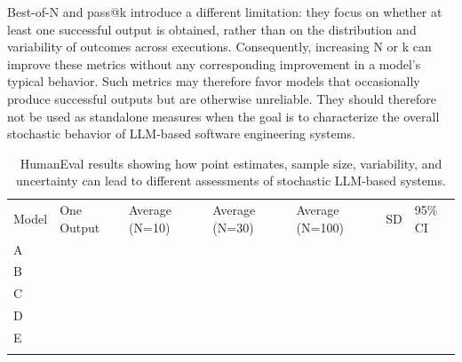 \documentclass{IEEEcsmag}
\begin{document}
Best-of-N and pass@k introduce a different limitation: they focus on whether at least one successful output is obtained, rather than on the distribution and variability of outcomes across executions. Consequently, increasing N or k can improve these metrics without any corresponding improvement in a model's typical behavior.  Such metrics may therefore favor models that occasionally produce successful outputs but are otherwise unreliable. They should therefore not be used as standalone measures when the goal is to characterize the overall stochastic behavior of LLM-based software engineering systems.



\begin{table}
	\vspace*{4pt}
	\caption{HumanEval results showing how point estimates, sample size, variability, and uncertainty can lead to different assessments of stochastic LLM-based systems.}
	\label{table:example-data}
	\begin{tabular*}{\linewidth}{lllllll}
		\toprule
		Model & One Output & Average (N=10) & Average (N=30) & Average (N=100) & SD  & 95\% CI\\
		\colrule
		A     &            &                &                &                 &                                                         &                                                              \\
		B     &            &                &                &                 &                                                         &                                                              \\
		C     &            &                &                &                 &                                                         &                                                              \\
		D     &            &                &                &                 &                                                         &                                                              \\
		E     &            &                &                &                 &                                                         &                                                             \\
		\botrule
	\end{tabular*}\vspace*{8pt}
\end{table}
\end{document}
